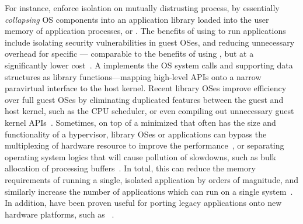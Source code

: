 For instance, \term{\liboses{}} enforce isolation on mutually distrusting process,
by essentially \emph{collapsing} OS components
into an application library loaded into the user memory of application processes, or \term{\picoprocs{}}.
The benefits of using \liboses{} to run applications include
isolating %
security vulnerabilities in guest OSes,
and reducing unnecessary %
overhead for specific \picoprocs{}
--- comparable to the benefits of using ,
but at a significantly lower cost~\citep{porter11drawbridge,unikernels,baumann13bascule}.
A \libos{} implements the OS system calls and supporting data structures as library functions---mapping
high-level APIs onto
a narrow paravirtual interface to the host kernel.
Recent library OSes improve efficiency over full guest OSes by eliminating duplicated features
between the guest and host kernel,
such as the CPU scheduler, or
even compiling out unnecessary guest kernel APIs~\citep{unikernels}.
Sometimes, on top of a minimized \term{\microkernel{}} that often has the size and functionality of a hypervisor,
library OSes or applications can bypass the multiplexing of hardware resource
to improve the performance~\citep{engler95exokernel},
or separating operating system logics that will cause pollution of slowdowns,
such as bulk allocation of processing buffers~\citep{leslie96nemesis}.
In total, this can reduce the memory requirements of running a single, isolated application
by orders of magnitude, and similarly
increase the number of applications which can run
on a single system~\citep{porter11drawbridge,unikernels}.
In addition, \liboses{} have been proven
useful for porting legacy applications
onto new hardware platforms, such as ~\citep{baumann14haven}.


